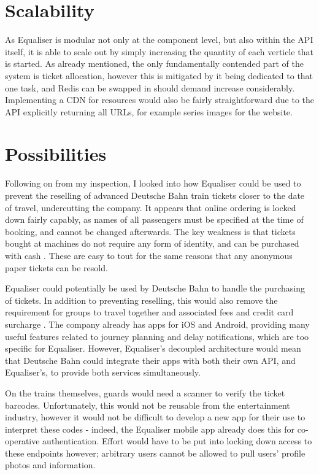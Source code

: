 \documentclass[12pt,a4paper]{bhamdissertation}
\begin{document}
\section{Scalability}

As Equaliser is modular not only at the component level, but also within the API itself, it is able to scale out by simply increasing the quantity of each verticle that is started. As already mentioned, the only fundamentally contended part of the system is ticket allocation, however this is mitigated by it being dedicated to that one task, and Redis can be swapped in should demand increase considerably. Implementing a CDN for resources would also be fairly straightforward due to the API explicitly returning all URLs, for example series images for the website.

\section{Possibilities}

Following on from my inspection, I looked into how Equaliser could be used to prevent the reselling of advanced Deutsche Bahn train tickets closer to the date of travel, undercutting the company. It appears that online ordering is locked down fairly capably, as names of all passengers must be specified at the time of booking, and cannot be changed afterwards. The key weakness is that tickets bought at machines do not require any form of identity, and can be purchased with cash \cite{D15}. These are easy to tout for the same reasons that any anonymous paper tickets can be resold.

Equaliser could potentially be used by Deutsche Bahn to handle the purchasing of tickets. In addition to preventing reselling, this would also remove the requirement for groups to travel together \cite{D17} and associated fees and credit card surcharge \cite{D171}. The company already has apps for iOS and Android, providing many useful features related to journey planning and delay notifications, which are too specific for Equaliser. However, Equaliser's decoupled architecture would mean that Deutsche Bahn could integrate their apps with both their own API, and Equaliser's, to provide both services simultaneously.

On the trains themselves, guards would need a scanner to verify the ticket barcodes. Unfortunately, this would not be reusable from the entertainment industry, however it would not be difficult to develop a new app for their use to interpret these codes - indeed, the Equaliser mobile app already does this for co-operative authentication. Effort would have to be put into locking down access to these endpoints however; arbitrary users cannot be allowed to pull users' profile photos and information.
\end{document}
